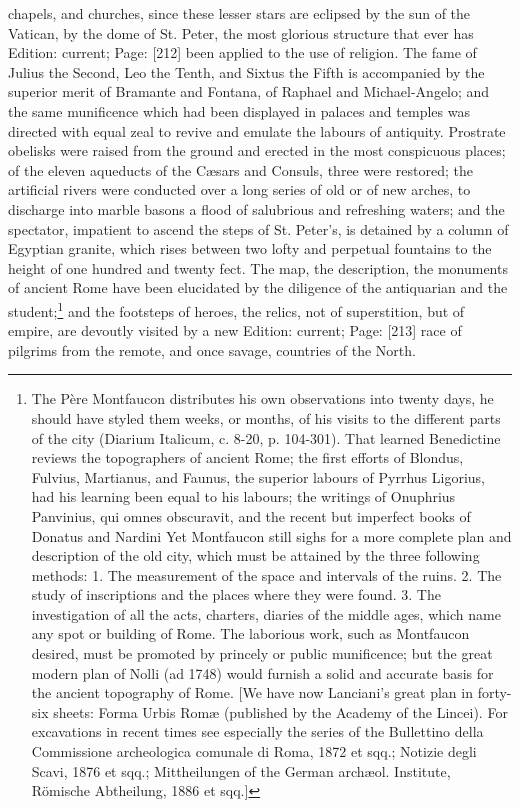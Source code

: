 chapels, and churches, since these lesser stars are eclipsed by the sun of the Vatican, by the dome of St. Peter, the most glorious structure that ever has Edition: current; Page: [212] been applied to the use of religion. The fame of Julius the Second, Leo the Tenth, and Sixtus the Fifth is accompanied by the superior merit of Bramante and Fontana, of Raphael and Michael-Angelo; and the same munificence which had been displayed in palaces and temples was directed with equal zeal to revive and emulate the labours of antiquity. Prostrate obelisks were raised from the ground and erected in the most conspicuous places; of the eleven aqueducts of the Cæsars and Consuls, three were restored; the artificial rivers were conducted over a long series of old or of new arches, to discharge into marble basons a flood of salubrious and refreshing waters; and the spectator, impatient to ascend the steps of St. Peter\texthebrew{}’s, is detained by a column of Egyptian granite, which rises between two lofty and perpetual fountains to the height of one hundred and twenty fect. The map, the description, the monuments of ancient Rome have been elucidated by the diligence of the antiquarian and the student;\footnote{The Père Montfaucon distributes his own observations into twenty days, he should have styled them weeks, or months, of his visits to the different parts of the city (Diarium Italicum, c. 8-20, p. 104-301). That learned Benedictine reviews the topographers of ancient Rome; the first efforts of Blondus, Fulvius, Martianus, and Faunus, the superior labours of Pyrrhus Ligorius, had his learning been equal to his labours; the writings of Onuphrius Panvinius, qui omnes obscuravit, and the recent but imperfect books of Donatus and Nardini Yet Montfaucon still sighs for a more complete plan and description of the old city, which must be attained by the three following methods: 1. The measurement of the space and intervals of the ruins. 2. The study of inscriptions and the places where they were found. 3. The investigation of all the acts, charters, diaries of the middle ages, which name any spot or building of Rome. The laborious work, such as Montfaucon desired, must be promoted by princely or public munificence; but the great modern plan of Nolli (ad 1748) would furnish a solid and accurate basis for the ancient topography of Rome. [We have now Lanciani\texthebrew{}’s great plan in forty-six sheets: Forma Urbis Romæ (published by the Academy of the Lincei). For excavations in recent times see especially the series of the Bullettino della Commissione archeologica comunale di Roma, 1872 et sqq.; Notizie degli Scavi, 1876 et sqq.; Mittheilungen of the German archæol. Institute, Römische Abtheilung, 1886 et sqq.]} and the footsteps of heroes, the relics, not of superstition, but of empire, are devoutly visited by a new Edition: current; Page: [213] race of pilgrims from the remote, and once savage, countries of the North.

